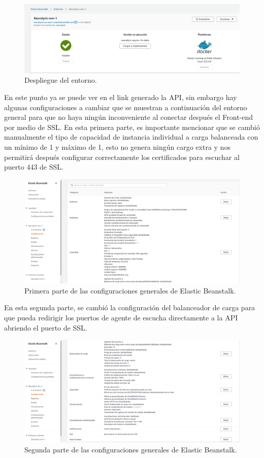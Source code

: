 \documentclass[12pt, a4paper, titlepage]{report}
\begin{document}
\begin{figure}[H]
	\includegraphics[width=12cm]{./imagenes/Desarrollo/BackEnd/paso_5.png}
	\centering 
	\caption{Despliegue del entorno.}
\end{figure}
En este punto ya se puede ver en el link generado la API, sin embargo hay algunas configuraciones a cambiar que se muestran a continuación del entorno general para que no haya ningún inconveniente al conectar después el Front-end por medio de SSL.
En esta primera parte, es importante mencionar que se cambió manualmente el tipo de capacidad de instancia individual a carga balanceada con un mínimo de 1 y máximo de 1, esto no genera ningún cargo extra y nos permitirá después configurar correctamente los certificados para escuchar al puerto 443 de SSL.
\begin{figure}[H]
	\includegraphics[width=12cm]{./imagenes/Desarrollo/BackEnd/config_1.png}
	\centering 
	\caption{Primera parte de las configuraciones generales de Elastic Beanstalk.}
\end{figure}
En esta segunda parte, se cambió la configuración del balanceador de carga para que pueda redirigir los puertos de agente de escucha directamente a la API abriendo el puerto de SSL.
\begin{figure}[H]
	\includegraphics[width=12cm]{./imagenes/Desarrollo/BackEnd/config_2.png}
	\centering 
	\caption{Segunda parte de las configuraciones generales de Elastic Beanstalk.}
\end{figure}
\end{document}
